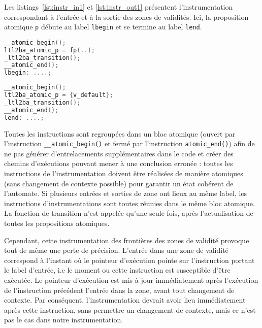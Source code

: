 Les listings~\ref{lst:instr_in1} et \ref{lst:instr_out1} présentent
l'instrumentation correspondant à l'entrée et à la sortie des zones de
validités. Ici, la proposition atomique \texttt{p} débute au label
\texttt{lbegin} et se termine au label \texttt{lend}.

\noindent\begin{minipage}{.45\textwidth}
  \begin{lstlisting}[language=C, frame=single, caption=Entrée de zone de
    validité (1),
    label=lst:instr_in1]
__atomic_begin();
ltl2ba_atomic_p = fp(..);
_ltl2ba_transition();
__atomic_end();
lbegin: ....;
\end{lstlisting}
\end{minipage}\hfill
\begin{minipage}{.45\textwidth}
  \begin{lstlisting}[language=C, frame=single, caption=Sortie de zone de
    validité (1),
    label=lst:instr_out1]
__atomic_begin();
ltl2ba_atomic_p = {v_default};
_ltl2ba_transition();
__atomic_end();
lend: ....;
\end{lstlisting}
\end{minipage}

Toutes les instructions sont regroupées dans un bloc atomique (ouvert
par l'instruction \texttt{\_\_atomic\_begin()} et fermé par
l'instruction \texttt{atomic\_end()}) afin de ne pas générer
d'entrelacements supplémentaires dans le code et créer des chemins
d'exécutions pouvant mener à une conclusion erronée : toutes les
instructions de l'instrumentation doivent être réalisées de manière
atomiques (sans changement de contexte possible) pour garantir un état
cohérent de l'automate. Si plusieurs entrées et sorties de zone ont
lieux au même label, les instructions d'instrumentations sont toutes
réunies dans le même bloc atomique. La fonction de transition n'est
appelée qu'une seule fois, après l'actualisation de toutes les
propositions atomiques.

Cependant, cette instrumentation des frontières des zones de validité
provoque tout de même une perte de précision. L'entrée dans une zone de
validité correspond à l'instant où le pointeur d'exécution pointe sur
l'instruction portant le label d'entrée, i.e le moment ou cette
instruction est susceptible d'être exécutée. Le pointeur d'exécution est
mis à jour immédiatement après l'exécution de l'instruction précédent
l'entrée dans la zone, avant tout changement de contexte. Par
conséquent, l'instrumentation devrait avoir lieu immédiatement après
cette instruction, sans permettre un changement de contexte, mais ce
n'est pas le cas dans notre instrumentation.

